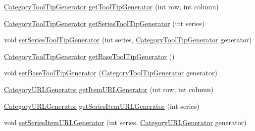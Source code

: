 \begin{DoxyCompactItemize}
\item 
\mbox{\hyperlink{interfaceorg_1_1jfree_1_1chart_1_1labels_1_1_category_tool_tip_generator}{Category\+Tool\+Tip\+Generator}} \mbox{\hyperlink{classorg_1_1jfree_1_1chart_1_1renderer_1_1category_1_1_abstract_category_item_renderer_a79d87ce1ccfe15b1be501fd600c46b21}{get\+Tool\+Tip\+Generator}} (int row, int column)
\item 
\mbox{\hyperlink{interfaceorg_1_1jfree_1_1chart_1_1labels_1_1_category_tool_tip_generator}{Category\+Tool\+Tip\+Generator}} \mbox{\hyperlink{classorg_1_1jfree_1_1chart_1_1renderer_1_1category_1_1_abstract_category_item_renderer_aacaf1b8c18bb07c8394b00a416f276ba}{get\+Series\+Tool\+Tip\+Generator}} (int series)
\item 
void \mbox{\hyperlink{classorg_1_1jfree_1_1chart_1_1renderer_1_1category_1_1_abstract_category_item_renderer_ad4d7d645eac3287a01ebfaa2bf9776ac}{set\+Series\+Tool\+Tip\+Generator}} (int series, \mbox{\hyperlink{interfaceorg_1_1jfree_1_1chart_1_1labels_1_1_category_tool_tip_generator}{Category\+Tool\+Tip\+Generator}} generator)
\item 
\mbox{\hyperlink{interfaceorg_1_1jfree_1_1chart_1_1labels_1_1_category_tool_tip_generator}{Category\+Tool\+Tip\+Generator}} \mbox{\hyperlink{classorg_1_1jfree_1_1chart_1_1renderer_1_1category_1_1_abstract_category_item_renderer_a17fbafe110567ad2f86b1512fb4bd6f2}{get\+Base\+Tool\+Tip\+Generator}} ()
\item 
void \mbox{\hyperlink{classorg_1_1jfree_1_1chart_1_1renderer_1_1category_1_1_abstract_category_item_renderer_ab6112bf842d0a0e3324c1f657d24be9c}{set\+Base\+Tool\+Tip\+Generator}} (\mbox{\hyperlink{interfaceorg_1_1jfree_1_1chart_1_1labels_1_1_category_tool_tip_generator}{Category\+Tool\+Tip\+Generator}} generator)
\item 
\mbox{\hyperlink{interfaceorg_1_1jfree_1_1chart_1_1urls_1_1_category_u_r_l_generator}{Category\+U\+R\+L\+Generator}} \mbox{\hyperlink{classorg_1_1jfree_1_1chart_1_1renderer_1_1category_1_1_abstract_category_item_renderer_a2fbd46ccfc0819544b8a1d4efe2e0e95}{get\+Item\+U\+R\+L\+Generator}} (int row, int column)
\item 
\mbox{\hyperlink{interfaceorg_1_1jfree_1_1chart_1_1urls_1_1_category_u_r_l_generator}{Category\+U\+R\+L\+Generator}} \mbox{\hyperlink{classorg_1_1jfree_1_1chart_1_1renderer_1_1category_1_1_abstract_category_item_renderer_a8281cfcc9d4be151f6ed682f16cca2a3}{get\+Series\+Item\+U\+R\+L\+Generator}} (int series)
\item 
void \mbox{\hyperlink{classorg_1_1jfree_1_1chart_1_1renderer_1_1category_1_1_abstract_category_item_renderer_a8bd0eb808e40ecf16e77228655a0a99d}{set\+Series\+Item\+U\+R\+L\+Generator}} (int series, \mbox{\hyperlink{interfaceorg_1_1jfree_1_1chart_1_1urls_1_1_category_u_r_l_generator}{Category\+U\+R\+L\+Generator}} generator)

\end{DoxyCompactItemize}
